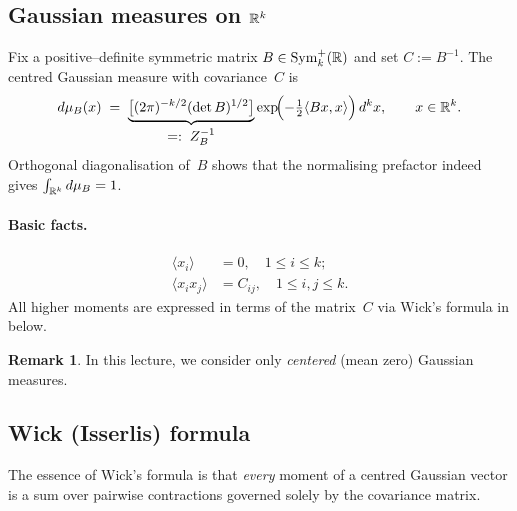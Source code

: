 \documentclass[letterpaper,11pt,oneside,reqno]{book}
\numberwithin{equation}{chapter}  %
\theoremstyle{definition}
\newtheorem{remark}[proposition]{Remark}
\begin{document}
\subsection{Gaussian measures on \texorpdfstring{$\Bbb R^{k}$}{Rk}}
\label{lecture15:subsec:multivariate-gaussian}

Fix a positive–definite symmetric matrix
$B\in\operatorname{Sym}_{k}^{+}(\Bbb R)$ and set
$C:=B^{-1}$.
The centred Gaussian measure with covariance~$C$ is
\begin{equation}
  d\mu_{B}(x)
  \;=\;
  \underbrace{\bigl[(2\pi)^{-k/2}(\det B)^{1/2}\bigr]}_{\displaystyle =:\;Z_{B}^{-1}}
  \exp\!\Bigl(-\tfrac12\langle Bx,x\rangle\Bigr)\,d^{k}x,
  \qquad x\in\Bbb R^{k}.
  \label{lecture15:eq:multivariate-gaussian-density}
\end{equation}
Orthogonal diagonalisation of~$B$ shows that the normalising
prefactor indeed gives $\int_{\Bbb R^{k}}d\mu_{B}=1$.

\paragraph{Basic facts.}
\begin{align}
  \langle x_{i}\rangle &= 0,
  \quad
  1\le i\le k;
  \label{lecture15:eq:mean-zero}\\
  \langle x_{i}x_{j}\rangle &= C_{ij},
  \quad
  1\le i,j\le k.
  \label{lecture15:eq:covariance}
\end{align}
All higher moments are expressed in terms of the matrix~$C$
via Wick’s formula in  below.

\begin{remark}
	In this lecture, we consider only \emph{centered} (mean zero) Gaussian measures.
\end{remark}

\subsection{Wick (Isserlis) formula}
\label{lecture15:subsec:wick}

The essence of Wick’s formula is that \emph{every} moment of a
centred Gaussian vector is a sum over pairwise contractions governed
solely by the covariance matrix.
\end{document}
